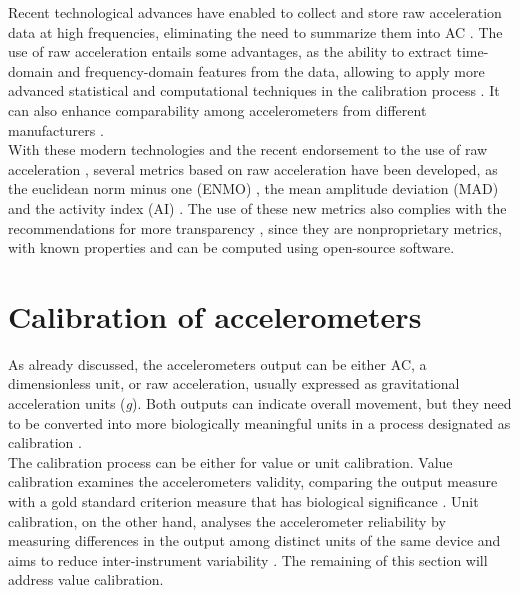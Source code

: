 \documentclass[11pt]{article}
\begin{document}
Recent technological advances have enabled to collect and store raw acceleration data at high frequencies, eliminating the need to summarize them into AC \cite{Bakrania_2016}. The use of raw acceleration entails some advantages, as the ability to extract time-domain and frequency-domain features from the data, allowing to apply more advanced statistical and computational techniques in the calibration process \cite{John_2013}. It can also enhance comparability among accelerometers from different manufacturers \cite{Mendes_2018, Rowlands_2016}. \\

With these modern technologies and the recent endorsement to the use of raw acceleration \cite{Freedson_2012}, several metrics based on raw acceleration have been developed, as the euclidean norm minus one (ENMO) \cite{vanHees_2013}, the mean amplitude deviation (MAD) \cite{Vaha-Ypya_2015} and the activity index (AI) \cite{Bai_2016}. The use of these new metrics also complies with the recommendations for more transparency \cite{Intille_2012}, since they are nonproprietary metrics, with known properties and can be computed using open-source software.

\section*{Calibration of accelerometers}

As already discussed, the accelerometers output can be either AC, a dimensionless unit, or raw acceleration, usually expressed as gravitational acceleration units (\textit{g}). Both outputs can indicate overall movement, but they need to be converted into more biologically meaningful units in a process designated as calibration \cite{Welk_2005}. \\

The calibration process can be either for value or unit calibration. Value calibration examines the accelerometers validity, comparing the output measure with a gold standard criterion measure that has biological significance \cite{Basset_2012}. Unit calibration, on the other hand, analyses the accelerometer reliability by measuring differences in the output among distinct units of the same device and aims to reduce inter-instrument variability \cite{Welk_2005, Basset_2012}. The remaining of this section will address value calibration. \\
\end{document}
